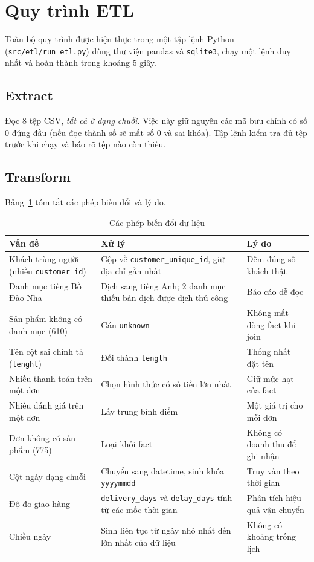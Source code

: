 \documentclass[12pt,a4paper]{article}
\newcommand{\code}[1]{\texttt{\small #1}}
\begin{document}
\section{Quy trình ETL}

Toàn bộ quy trình được hiện thực trong một tập lệnh Python (\code{src/etl/run\_etl.py}) dùng thư viện pandas và
\code{sqlite3}, chạy một lệnh duy nhất và hoàn thành trong khoảng 5 giây.

\subsection{Extract}
Đọc 8 tệp CSV, \emph{tất cả ở dạng chuỗi}. Việc này giữ nguyên các mã bưu chính có số 0 đứng đầu (nếu đọc thành
số sẽ mất số 0 và sai khóa). Tập lệnh kiểm tra đủ tệp trước khi chạy và báo rõ tệp nào còn thiếu.

\subsection{Transform}
Bảng~\ref{tab:transform} tóm tắt các phép biến đổi và lý do.

\begin{table}[h]
\centering
\caption{Các phép biến đổi dữ liệu}\label{tab:transform}
\small
\begin{tabularx}{\textwidth}{@{}>{\raggedright\arraybackslash}p{3.4cm} >{\raggedright\arraybackslash}X >{\raggedright\arraybackslash}X@{}}
\toprule
\textbf{Vấn đề} & \textbf{Xử lý} & \textbf{Lý do}\\
\midrule
Khách trùng người (nhiều \code{customer\_id}) & Gộp về \code{customer\_unique\_id}, giữ địa chỉ gần nhất & Đếm đúng số khách thật\\
Danh mục tiếng Bồ Đào Nha & Dịch sang tiếng Anh; 2 danh mục thiếu bản dịch được dịch thủ công & Báo cáo dễ đọc\\
Sản phẩm không có danh mục (610) & Gán \code{unknown} & Không mất dòng fact khi join\\
Tên cột sai chính tả (\code{lenght}) & Đổi thành \code{length} & Thống nhất đặt tên\\
Nhiều thanh toán trên một đơn & Chọn hình thức có số tiền lớn nhất & Giữ mức hạt của fact\\
Nhiều đánh giá trên một đơn & Lấy trung bình điểm & Một giá trị cho mỗi đơn\\
Đơn không có sản phẩm (775) & Loại khỏi fact & Không có doanh thu để ghi nhận\\
Cột ngày dạng chuỗi & Chuyển sang datetime, sinh khóa \code{yyyymmdd} & Truy vấn theo thời gian\\
Độ đo giao hàng & \code{delivery\_days} và \code{delay\_days} tính từ các mốc thời gian & Phân tích hiệu quả vận chuyển\\
Chiều ngày & Sinh liên tục từ ngày nhỏ nhất đến lớn nhất của dữ liệu & Không có khoảng trống lịch\\
\bottomrule
\end{tabularx}
\end{table}
\end{document}
